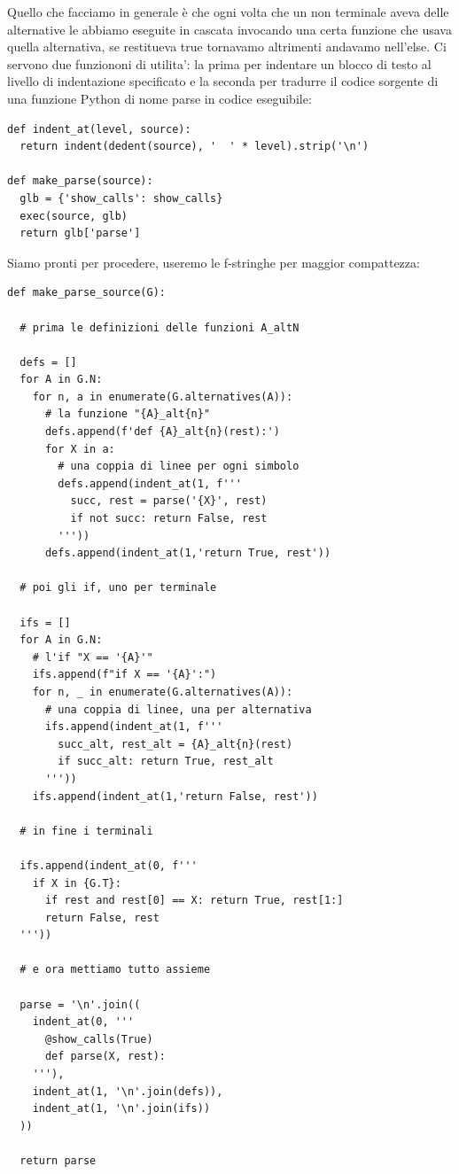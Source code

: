 Quello che facciamo in generale è che ogni volta che un non terminale aveva delle alternative le abbiamo eseguite in cascata invocando una certa funzione che usava quella alternativa, se restitueva true tornavamo altrimenti andavamo nell'else.
Ci servono due funziononi di utilita': la prima per indentare un blocco di testo al livello di indentazione specificato e la seconda per tradurre il codice sorgente di una funzione Python di nome parse in codice eseguibile:
\begin{lstlisting}
def indent_at(level, source):
  return indent(dedent(source), '  ' * level).strip('\n')

def make_parse(source):
  glb = {'show_calls': show_calls}
  exec(source, glb)
  return glb['parse']
\end{lstlisting}
Siamo pronti per procedere, useremo le f-stringhe per maggior compattezza:
\begin{lstlisting}
def make_parse_source(G):

  # prima le definizioni delle funzioni A_altN

  defs = []
  for A in G.N:
    for n, a in enumerate(G.alternatives(A)):
      # la funzione "{A}_alt{n}"
      defs.append(f'def {A}_alt{n}(rest):')
      for X in a: 
        # una coppia di linee per ogni simbolo
        defs.append(indent_at(1, f'''
          succ, rest = parse('{X}', rest)
          if not succ: return False, rest
        '''))
      defs.append(indent_at(1,'return True, rest'))

  # poi gli if, uno per terminale

  ifs = []
  for A in G.N:
    # l'if "X == '{A}'"
    ifs.append(f"if X == '{A}':")
    for n, _ in enumerate(G.alternatives(A)): 
      # una coppia di linee, una per alternativa
      ifs.append(indent_at(1, f'''
        succ_alt, rest_alt = {A}_alt{n}(rest)
        if succ_alt: return True, rest_alt
      '''))
    ifs.append(indent_at(1,'return False, rest'))

  # in fine i terminali

  ifs.append(indent_at(0, f'''
    if X in {G.T}:
      if rest and rest[0] == X: return True, rest[1:]
      return False, rest
  '''))

  # e ora mettiamo tutto assieme 

  parse = '\n'.join((
    indent_at(0, '''
      @show_calls(True)
      def parse(X, rest):
    '''), 
    indent_at(1, '\n'.join(defs)), 
    indent_at(1, '\n'.join(ifs))
  ))

  return parse
\end{lstlisting}

